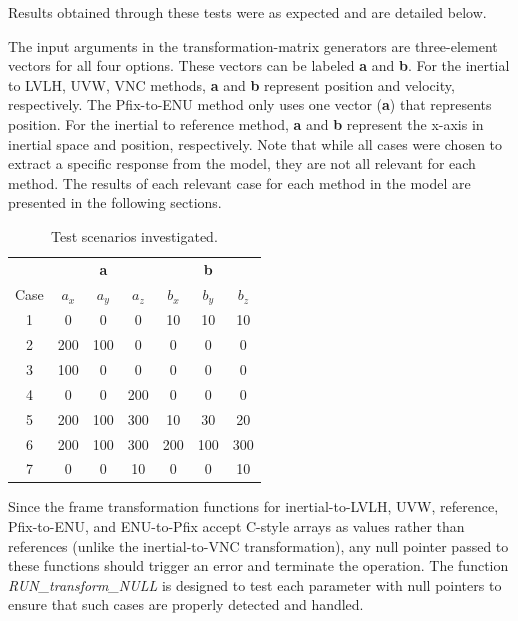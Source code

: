 \documentclass[11pt,fleqn]{report}
\begin{document}
Results obtained through these tests were as expected and are detailed below.

The input arguments in the transformation-matrix generators are
three-element vectors for all four options. These vectors can be
labeled \textbf{a} and \textbf{b}. For the inertial to LVLH, UVW,
VNC methods, \textbf{a} and \textbf{b} represent position and velocity,
respectively. The Pfix-to-ENU method only uses one vector (\textbf{a}) that
represents position. For the inertial to reference method, \textbf{a} and
\textbf{b} represent
the x-axis in inertial space and position, respectively. Note that while
all cases were chosen to extract a specific response from the model, they
are not all relevant for each method. The results of each relevant case for
each method in the model are presented in the following sections.

\begin{table}[ht!]
\caption{Test scenarios investigated.}
\centering
\begin{tabular}{c c c c c c c}
\hline \hline
 & \multicolumn{3}{c}{\textbf{a}} & \multicolumn{3}{c}{\textbf{b}} \\
 Case & $a_x$ & $a_y$ & $a_z$ & $b_x$ & $b_y$ & $b_z$ \\ \hline
1 & 0 & 0 & 0 & 10 & 10 & 10 \\
2 & 200 & 100 & 0 & 0 & 0 & 0 \\
3 & 100 & 0 & 0 & 0 & 0 & 0 \\
4 & 0 & 0 & 200 & 0 & 0 & 0 \\
5 & 200 & 100 & 300 & 10 & 30 & 20 \\
6 & 200 & 100 & 300 & 200 & 100 & 300 \\
7 & 0 & 0 & 10 & 0 & 0 & 10 \\ \hline \hline
\end{tabular}
\label{tab:test}
\end{table}

Since the frame transformation functions for inertial-to-LVLH, UVW, reference, 
Pfix-to-ENU, and ENU-to-Pfix accept C-style arrays as values rather than 
references (unlike the inertial-to-VNC transformation), any null pointer 
passed to these functions should trigger an error and terminate the operation. 
The function \textit{RUN\_transform\_NULL} is designed to test each parameter with null 
pointers to ensure that such cases are properly detected and handled.
\end{document}

